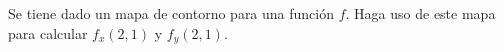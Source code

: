 \item Se tiene dado un mapa de contorno para una función $f$. Haga uso de este mapa para calcular $f_x(2, 1)$ y $f_y(2, 1)$.
